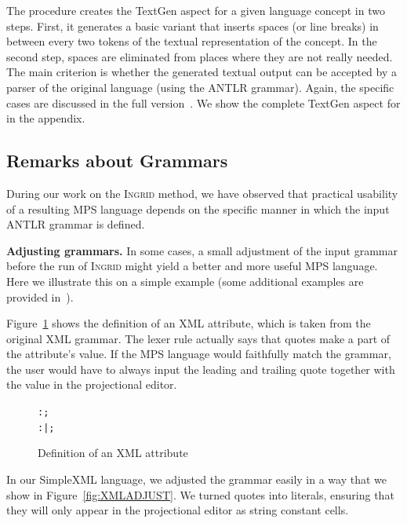 The procedure creates the TextGen aspect for a given language concept in two steps.
First, it generates a basic variant that inserts spaces (or line breaks) in between every two tokens of the textual representation of the concept.
In the second step, spaces are eliminated from places where they are not really needed.
The main criterion is whether the generated textual output can be accepted by a parser of the original language (using the ANTLR grammar).
Again, the specific cases are discussed in the full version~\cite{ref:TRFULL}.
We show the complete TextGen aspect for  in the appendix.

\subsection{Remarks about Grammars}
\label{sect:REMARKSGRAMMARS}

During our work on the \textsc{Ingrid} method, we have observed that practical usability of a resulting MPS language depends on the specific manner in which the input ANTLR grammar is defined.

\noindent\textbf{Adjusting grammars.}
In some cases, a small adjustment of the input grammar before the run of \textsc{Ingrid} might yield a better and more useful MPS language.
Here we illustrate this on a simple example (some additional examples are provided in~\cite{ref:TRFULL}).

Figure~\ref{fig:XMLATTRIB} shows the definition of an XML attribute, which is taken from the original XML grammar.
The lexer rule  actually says that quotes make a part of the attribute's value.
If the MPS language would faithfully match the grammar, the user would have to always input the leading and trailing quote together with the value in the projectional editor.

\begin{figure}[ht]
\vspace{-1mm}
\begin{alltt}
\small
   :  \antlrliteral{=}  ;
   :  \antlrregex{~["]*}  |  \antlrregex{~[']*}  ;
\end{alltt}
\caption{Definition of an XML attribute}
\label{fig:XMLATTRIB}
\end{figure}

In our SimpleXML language, we adjusted the grammar easily in a way that we show in Figure~\ref{fig:XMLADJUST}.
We turned quotes into literals, ensuring that they will only appear in the projectional editor as string constant cells.

